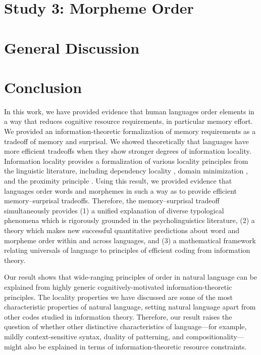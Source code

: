 \documentclass[man]{apa7}
\newcommand{\citep}{\parencite}
\begin{document}
\section{Study 3: Morpheme Order}\label{sec:morphemes}




\section{General Discussion}\label{sec:discussion}




\section{Conclusion}\label{sec:conclusion}

In this work, we have provided evidence that human languages order elements in a way that reduces cognitive resource requirements, in particular memory effort.
We provided an information-theoretic formalization of memory requirements as a tradeoff of memory and surprisal.
We showed theoretically that languages have more efficient tradeoffs when they show stronger degrees of information locality.
Information locality provides a formalization of various locality principles from the linguistic literature, including dependency locality \citep{gibson1998linguistic}, domain minimization \citep{hawkins2004efficiency}, and the proximity principle \citep{givon1985iconicity}.
Using this result, we provided evidence that languages order words and morphemes in such a way as to provide efficient memory--surprisal tradeoffs.
Therefore, the memory--surprisal tradeoff simultaneously provides (1) a unified explanation of diverse typological phenomena which is rigorously grounded in the psycholinguistics literature, (2) a theory which makes new successful quantitative predictions about word and morpheme order within and across languages, and (3) a mathematical framework relating universals of language to principles of efficient coding from information theory. 

Our result shows that wide-ranging principles of order in natural language can be explained from highly generic cognitively-motivated information-theoretic principles. The locality properties we have discussed are some of the most characteristic properties of natural language, setting natural language apart from other codes studied in information theory.
Therefore, our result raises the question of whether other distinctive characteristics of language---for example, mildly context-sensitive syntax, duality of patterning, and compositionality---might also be explained in terms of information-theoretic resource constraints.






\printbibliography
\end{document}
